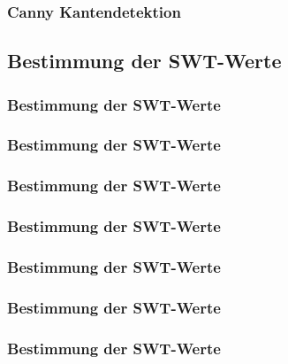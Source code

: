 \documentclass[9pt]{beamer}
\begin{document}
			\begin{frame}
				\frametitle{Canny Kantendetektion}
		    		
			\end{frame}
			
	
		\subsection{Bestimmung der SWT-Werte}
			\begin{frame}
				\frametitle{Bestimmung der SWT-Werte}
		    		
			\end{frame}
			
			\begin{frame}
				\frametitle{Bestimmung der SWT-Werte}
		    		
			\end{frame}
			
			\begin{frame}
				\frametitle{Bestimmung der SWT-Werte}
		    		
			\end{frame}
			
			\begin{frame}
				\frametitle{Bestimmung der SWT-Werte}
		    		
			\end{frame}
			
			\begin{frame}
				\frametitle{Bestimmung der SWT-Werte}
		    		
			\end{frame}
			
			\begin{frame}
				\frametitle{Bestimmung der SWT-Werte}
		    		
			\end{frame}
			
			\begin{frame}
				\frametitle{Bestimmung der SWT-Werte}
		    		
			\end{frame}
	
\end{document}
